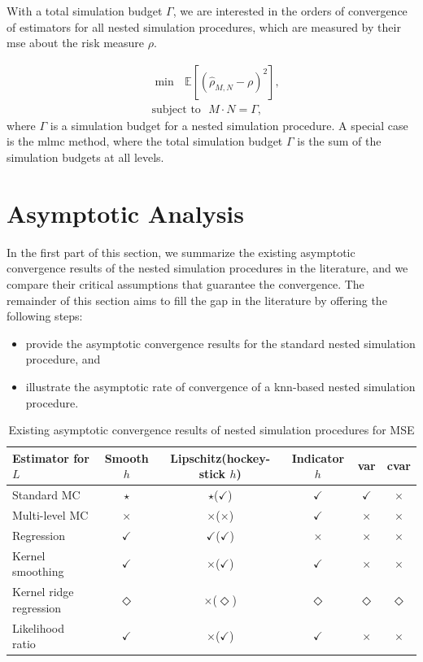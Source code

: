 With a total simulation budget $\Gamma$, we are interested in the orders of convergence of estimators for all nested simulation procedures, which are measured by their \gls{mse} about the risk measure $\rho$.

\begin{align}
    & \min ~~~ \mathbb{E} \left[ \left( \hat{\rho}_{M, N} - \rho \right)^2 \right], \nonumber \\
    & \text{subject to} ~~~ M \cdot N = \Gamma, 
\end{align}
where $\Gamma$ is a simulation budget for a nested simulation procedure.
A special case is the \gls{mlmc} method, where the total simulation budget $\Gamma$ is the sum of the simulation budgets at all levels.

\section{Asymptotic Analysis}\label{sec1:asymptotic-convergence}
In the first part of this section, we summarize the existing asymptotic convergence results of the nested simulation procedures in the literature, and we compare their critical assumptions that guarantee the convergence.
The remainder of this section aims to fill the gap in the literature by offering the following steps:
\begin{itemize}
    \item provide the asymptotic convergence results for the standard nested simulation procedure, and
    \item illustrate the asymptotic rate of convergence of a \gls{knn}-based nested simulation procedure.
\end{itemize}

\begin{table}[ht]
    \centering
    \footnotesize
    \begin{tabular}{|l|c|c|c|c|c|}
    \hline
    \textbf{Estimator for} $L$ & \textbf{Smooth} $h$ & \textbf{Lipschitz}(\textbf{hockey-stick} $h$) & \textbf{Indicator} $h$ & \textbf{\gls{var}} & \textbf{\gls{cvar}} \\
    \hline
    Standard MC & $\star$ & $\star$($\checkmark$) & $\checkmark$ & $\checkmark$ & $\times$ \\
    \hline
    Multi-level MC & $\times$ & $\times$($\times$) & $\checkmark$ & $\times$ & $\times$ \\
    \hline
    Regression & $\checkmark$ & $\checkmark$($\checkmark$) & $\times$ & $\times$ & $\times$ \\
    \hline
    Kernel smoothing & $\checkmark$ & $\times$($\checkmark$) & $\checkmark$ & $\times$ & $\times$ \\
    \hline
    Kernel ridge regression & $\Diamond$ & $\times$($\Diamond$) & $\Diamond$ & $\Diamond$ & $\Diamond$ \\
    \hline
    Likelihood ratio & $\checkmark$ & $\times$($\checkmark$) & $\checkmark$ & $\times$ & $\times$ \\
    \hline
    \end{tabular}
    \caption{Existing asymptotic convergence results of nested simulation procedures for MSE}
\label{tab1:asymConv-mse}
\end{table}


